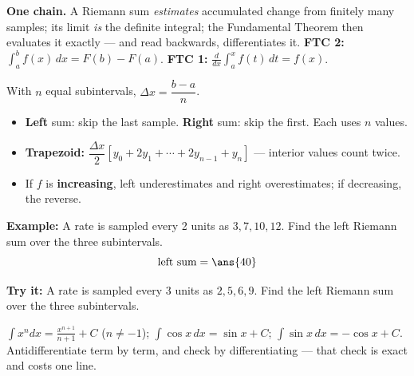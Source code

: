 \documentclass[12pt]{article}
\begin{document}

\begin{formulabox}
\textbf{One chain.} A Riemann sum \emph{estimates} accumulated change from
finitely many samples; its limit \emph{is} the definite integral; the
Fundamental Theorem then evaluates it exactly --- and read backwards,
differentiates it.
\textbf{FTC 2:} $\int_a^b f(x)\,dx = F(b) - F(a)$. \quad
\textbf{FTC 1:} $\frac{d}{dx}\int_a^x f(t)\,dt = f(x)$.
\end{formulabox}


\begin{formulabox}
With $n$ equal subintervals, $\Delta x = \dfrac{b-a}{n}$.
\begin{itemize}[leftmargin=0.9cm, itemsep=1pt, topsep=1pt]
\item \textbf{Left} sum: skip the last sample. \textbf{Right} sum: skip the
first. Each uses $n$ values.
\item \textbf{Trapezoid:} $\dfrac{\Delta x}{2}\left[y_0 + 2y_1 + \cdots +
2y_{n-1} + y_n\right]$ --- interior values count twice.
\item If $f$ is \textbf{increasing}, left underestimates and right
overestimates; if decreasing, the reverse.
\end{itemize}
\end{formulabox}

\begin{examplebox}
\textbf{Example:} A rate is sampled every 2 units as $3, 7, 10, 12$. Find the
left Riemann sum over the three subintervals.
\[ \text{left sum} = \ans{40} \]
\end{examplebox}

\begin{tryitbox}
\textbf{Try it:} A rate is sampled every 3 units as $2, 5, 6, 9$. Find the left
Riemann sum over the three subintervals.\\[2pt]
\end{tryitbox}


\begin{formulabox}
$\displaystyle\int x^n dx = \frac{x^{n+1}}{n+1} + C$ \; ($n \neq -1$); \;
$\int \cos x\,dx = \sin x + C$; \; $\int \sin x\,dx = -\cos x + C$.\\[2pt]
Antidifferentiate term by term, and check by differentiating --- that check is
exact and costs one line.
\end{formulabox}
\end{document}
